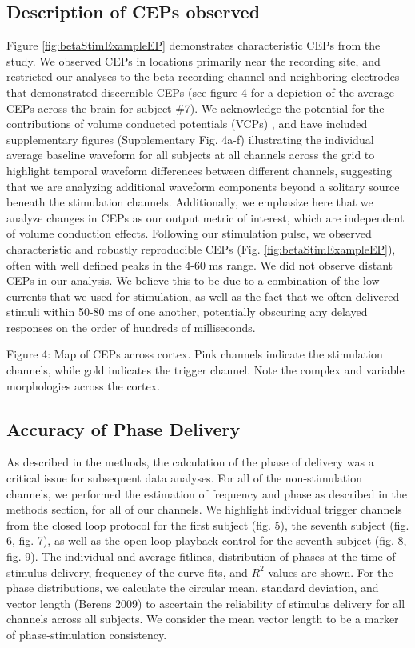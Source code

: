 \subsection{Description of CEPs observed}
Figure \ref{fig:betaStimExampleEP} demonstrates characteristic CEPs from the study. We observed CEPs in locations primarily near the recording site, and restricted our analyses to the beta-recording channel and neighboring electrodes that demonstrated discernible CEPs (see figure 4 for a depiction of the average CEPs across the brain for subject \#7). We acknowledge the potential for the contributions of volume conducted potentials (VCPs) \cite{Shimada2017,Keller2014d,Entz2014b}, and have included supplementary figures (Supplementary Fig. 4a-f)  illustrating the individual average baseline waveform for all subjects at all channels across the grid to highlight temporal waveform differences between different channels, suggesting that we are analyzing additional waveform components beyond a solitary source beneath the stimulation channels. Additionally, we emphasize here that we analyze changes in CEPs as our output metric of interest, which are independent of volume conduction effects. Following our stimulation pulse, we observed characteristic and robustly reproducible CEPs (Fig. \ref{fig:betaStimExampleEP}), often with well defined peaks in the 4-60 ms range. We did not observe distant CEPs in our analysis. We believe this to be due to a combination of the low currents that we used for stimulation, as well as the fact that we often delivered stimuli within 50-80 ms of one another, potentially obscuring any delayed responses on the order of hundreds of milliseconds. 

Figure 4: Map of CEPs across cortex. Pink channels indicate the stimulation channels, while gold indicates the trigger channel. Note the complex and variable morphologies across the cortex. 

\subsection{Accuracy of Phase Delivery}
As described in the methods, the calculation of the phase of delivery was a critical issue for subsequent data analyses. For all of the non-stimulation channels, we performed the estimation of frequency and phase as described in the methods section, for all of our channels. We highlight individual trigger channels from the closed loop protocol for the first subject (fig. 5), the seventh subject (fig. 6, fig. 7), as well as the open-loop playback control for the seventh subject (fig. 8, fig. 9). The individual and average fitlines, distribution of phases at the time of stimulus delivery, frequency of the curve fits, and $R^2$ values are shown. For the phase distributions, we calculate the circular mean, standard deviation, and vector length (Berens 2009) to ascertain the reliability of stimulus delivery for all channels across all subjects. We consider the mean vector length to be a marker of phase-stimulation consistency. 


